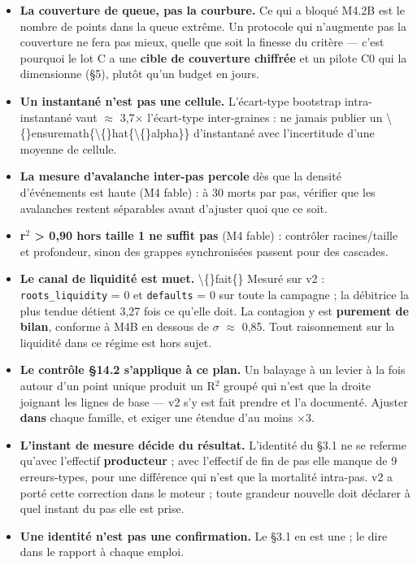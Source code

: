 \documentclass[11pt,a4paper]{article}
\newcommand{\code}[1]{\texttt{#1}}
\begin{document}
\begin{itemize}
\item \textbf{La couverture de queue, pas la courbure.} Ce qui a bloqué M4.2B est le nombre de points dans la queue extrême. Un protocole qui n'augmente pas la couverture ne fera pas mieux, quelle que soit la finesse du critère --- c'est pourquoi le lot C a une \textbf{cible de couverture chiffrée} et un pilote C0 qui la dimensionne (§5), plutôt qu'un budget en jours.
\item \textbf{Un instantané n'est pas une cellule.} L'écart-type bootstrap intra-instantané vaut \ensuremath{\approx} 3,7\ensuremath{\times} l'écart-type inter-graines : ne jamais publier un \textbackslash\{\}ensuremath\{\textbackslash\{\}hat\{\textbackslash\{\}alpha\}\} d'instantané avec l'incertitude d'une moyenne de cellule.
\item \textbf{La mesure d'avalanche inter-pas percole} dès que la densité d'événements est haute (M4 fable) : à 30 morts par pas, vérifier que les avalanches restent séparables avant d'ajuster quoi que ce soit.
\item \textbf{r\ensuremath{^2} > 0,90 hors taille 1 ne suffit pas} (M4 fable) : contrôler racines/taille et profondeur, sinon des grappes synchronisées passent pour des cascades.
\item \textbf{Le canal de liquidité est muet.} \textbackslash\{\}fait\{\} Mesuré sur v2 : \code{roots\_liquidity} = 0 et \code{defaults} = 0 sur toute la campagne ; la débitrice la plus tendue détient 3,27 fois ce qu'elle doit. La contagion y est \textbf{purement de bilan}, conforme à M4B en dessous de \ensuremath{\sigma} \ensuremath{\approx} 0,85. Tout raisonnement sur la liquidité dans ce régime est hors sujet.
\item \textbf{Le contrôle §14.2 s'applique à ce plan.} Un balayage à un levier à la fois autour d'un point unique produit un R\ensuremath{^2} groupé qui n'est que la droite joignant les lignes de base --- v2 s'y est fait prendre et l'a documenté. Ajuster \textbf{dans} chaque famille, et exiger une étendue d'au moins \ensuremath{\times}3.
\item \textbf{L'instant de mesure décide du résultat.} L'identité du §3.1 ne se referme qu'avec l'effectif \textbf{producteur} ; avec l'effectif de fin de pas elle manque de 9 erreurs-types, pour une différence qui n'est que la mortalité intra-pas. v2 a porté cette correction dans le moteur ; toute grandeur nouvelle doit déclarer à quel instant du pas elle est prise.
\item \textbf{Une identité n'est pas une confirmation.} Le §3.1 en est une ; le dire dans le rapport à chaque emploi.
\end{itemize}
\end{document}
